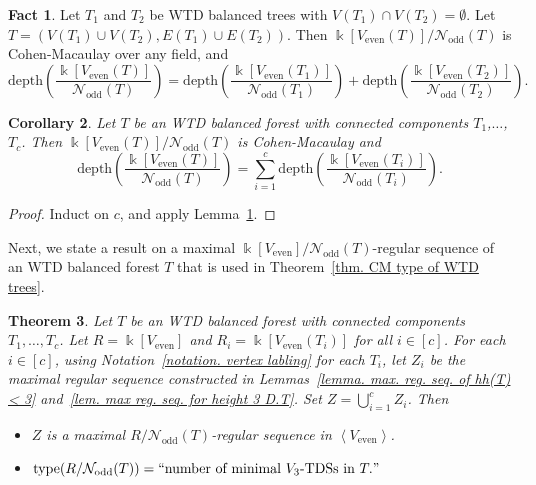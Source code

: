 \documentclass[12pt, reqno]{amsart}
\theoremstyle{definition}
\theoremstyle{plain}
\newtheorem{theorem}{Theorem}[subsection]
\newtheorem{corollary}[theorem]{Corollary}
\theoremstyle{definition}
\newtheorem{fact}[theorem]{Fact}
\newcommand{\tp}{\mbox{type}}
\newcommand{\depth}{\mbox{depth}}
\newcommand{\kk}{\Bbbk}
\newcommand\gen[1]{\left\langle #1 \right\rangle}
\newcommand{\NN}{\mathcal{N}}
\begin{document}
\begin{fact}\label{fact. delta forest are CM}
    Let $T_1$ and $T_2$ be WTD balanced trees with $V(T_1) \cap V(T_2) = \emptyset$.
    Let $T = (V(T_1) \cup V(T_2), E(T_1) \cup E(T_2))$.
    Then $\kk[V_{\text{even}}(T)]/\NN_{\text{odd}}(T)$ is Cohen-Macaulay over any field, and
    $$
    \depth\left(\frac{\kk[V_{\text{even}}(T)]}{\NN_{\text{odd}}(T)}\right) = \depth\left(\frac{\kk[V_{\text{even}}(T_1)]}{\NN_{\text{odd}}(T_1)}\right) + \depth\left(\frac{\kk[V_{\text{even}}(T_2)]}{\NN_{\text{odd}}(T_2)}\right).
    $$
\end{fact}

\begin{corollary}\label{cor. CMness and depth of Delta-forests}
    Let $T$ be an WTD balanced forest with connected components $T_1$,$\dots$,$T_c$.
    Then $\kk[V_{\text{even}}(T)]/\NN_{\text{odd}}(T)$ is Cohen-Macaulay and
    $$
    \depth\left(\frac{\kk[V_{\text{even}}(T)]}{\NN_{\text{odd}}(T)}\right) = \sum_{i = 1}^c \depth\left(\frac{\kk[V_{\text{even}}(T_i)]}{\NN_{\text{odd}}(T_i)}\right).
    $$
\end{corollary}

\begin{proof}
    Induct on $c$, and apply Lemma~\ref{fact. delta forest are CM}.
\end{proof}

Next, we state a result on a maximal $\kk[V_{\text{even}}]/\NN_{\text{odd}}(T)$-regular sequence of an WTD balanced forest $T$ that is used in Theorem~\ref{thm. CM type of WTD trees}.

\begin{theorem}\label{thm. max. reg. seq. and type of Delta-forest}
    Let $T$ be an WTD balanced forest with connected components $T_1,\dots,T_c$. 
    Let $R = \kk[V_{\text{even}}]$ and $R_i = \kk[V_{\text{even}}(T_i)]$ for all $i \in [c]$.
    For each $i \in [c]$, using Notation~\ref{notation. vertex labling} for each $T_i$, let $Z_i$ be the maximal regular sequence constructed in Lemmas~\ref{lemma. max. reg. seq. of hh(T) < 3} and~\ref{lem. max reg. seq. for height 3 D.T}.
    Set $Z = \bigcup_{i = 1}^c Z_i$. 
    Then 
    \begin{itemize}
        \item[(1)]$Z$ is a maximal $R/\NN_{\text{odd}}(T)$-regular sequence in $\gen{V_{\text{even}}}$.
        \item[(2)] $\tp(R/\NN_{\text{odd}}(T)) =``\mbox{number of minimal $V_3$-TDSs in }T."$
    \end{itemize}
\end{theorem}
\end{document}
